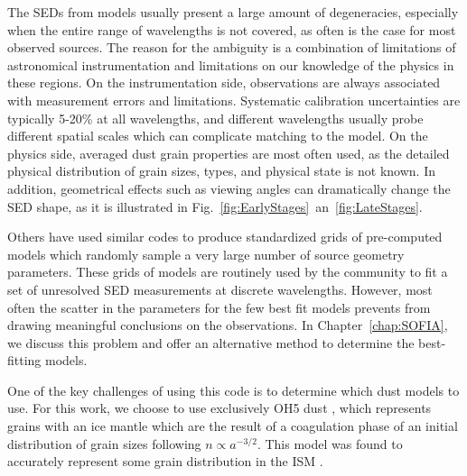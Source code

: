 The SEDs from models usually present a large amount of degeneracies, especially when the entire range of wavelengths is not covered, as often is the case for most observed sources. The reason for the ambiguity is a combination of limitations of astronomical instrumentation and limitations on our knowledge of the physics in these regions. On the instrumentation side, observations are always associated with measurement errors and limitations. Systematic calibration uncertainties are typically 5-20\% at all wavelengths, and different wavelengths usually probe different spatial scales which can complicate matching to the model. On the physics side, averaged dust grain properties are most often used, as the detailed physical distribution of grain sizes, types, and physical state is not known. In addition, geometrical effects such as viewing angles can dramatically change the SED shape, as it is illustrated in Fig.~\ref{fig:EarlyStages}~an~\ref{fig:LateStages}.


Others \citep[e.g.,][]{Robitaille:2006cb} have used similar codes to produce standardized grids of pre-computed models which randomly sample a very large number of source geometry parameters. These grids of models are routinely used by the community to fit a set of unresolved SED measurements at discrete wavelengths. However, most often the scatter in the parameters for the few best fit models prevents from drawing meaningful conclusions on the observations. In Chapter~\ref{chap:SOFIA}, we discuss this problem and offer an alternative method to determine the best-fitting models.


One of the key challenges of using this code is to determine which dust models to use. For this work, we choose to use exclusively OH5 dust \citep{Ossenkopf:1994tq}, which represents grains with an ice mantle which are the result of a coagulation phase of an initial distribution of grain sizes following $n\propto a^{-3/2}$. This model was found to accurately represent some grain distribution in the ISM \citep[see e.g.][]{Dunham:2010bx}.

